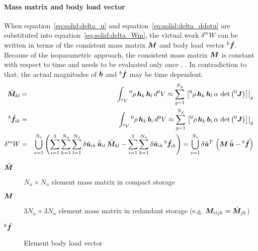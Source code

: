 \paragraph{Mass matrix and body load vector}
When equation~\ref{eq:solid:delta_u} and equation~\ref{eq:solid:delta_ddotu} are substituted into equation~\ref{eq:solid:delta_Wm},
the virtual work $\delta^mW$ can be written in terms of the consistent mass matrix $\bm{M}$ and body load vector $^b\hat{\bm{f}}$.
Because of the isoparametric approach, the consistent mass matrix $\bm{M}$ is constant with respect to time and needs to be evaluated only once \cite{BATHE2016}, \cite{KUEBLER2005}.
In contradiction to that, the actual magnitudes of $\bm{b}$ and $^b\hat{\bm{f}}$ may be time dependent.
\begin{eqnarray}
\hat{\bm{M}}_{kl} & = & \int_{^0V} {^0}\rho \, \bm{h}_k \, \bm{h}_l \, d^0V \approx \sum_{g=1}^{N_g} \left.\left[{^0}\rho \, \bm{h}_k \, \bm{h}_l \, \alpha \, \det{\left({^0}\bm{J}\right)}\right]\right\vert_{g} \\
{^b}\hat{\bm{f}}_{ik} & = & \int_{^0V} {^0}\rho \, \bm{h}_k \, \bm{b}_i \, d^0V \approx \sum_{g=1}^{N_g} \left.\left[{^0}\rho \, \bm{h}_k \, \bm{b}_i \, \alpha \, \det{\left({^0}\bm{J}\right)}\right]\right\vert_{g} \\
\delta^{m}W & = & \bigcup_{e=1}^{N_e}\left(\sum_{i=1}^3\sum_{k=1}^{N_n}\sum_{l=1}^{N_n} \delta\hat{\bm{u}}_{ik} \, \ddot{\hat{\bm{u}}}_{il} \, \hat{\bm{M}}_{kl}
 - \sum_{i=1}^3\sum_{k=1}^{N_n} \delta\hat{\bm{u}}_{ik} \, {^b}\hat{\bm{f}}_{ik}\right) = \bigcup_{e=1}^{N_e} \delta\hat{\bm{u}}^T \, \left(\bm{M} \, \ddot{\hat{\bm{u}}} - {^b}\hat{\bm{f}} \right)
\end{eqnarray}
\begin{description}
\item[$\hat{\bm{M}}$] $N_n\times N_n$ element mass matrix in compact storage
\item[$\bm{M}$] $3 N_n \times 3 N_n$ element mass matrix in redundant storage (e.g. $\bm{M}_{iijk} = \hat{\bm{M}}_{jk}$)
\item[${^b}\hat{\bm{f}}$] Element body load vector
\end{description}

